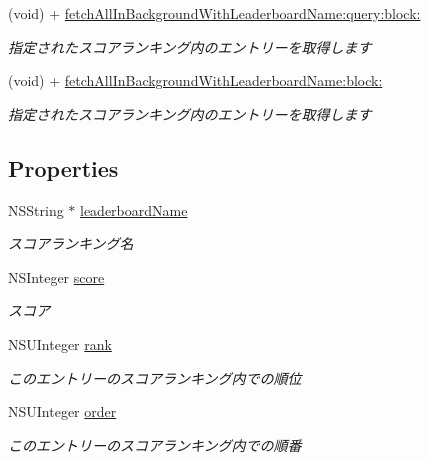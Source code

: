 \begin{DoxyCompactItemize}
(void) + \hyperlink{interface_b_d_leaderboard_entry_af0e742839e99015b1cfdb2f86c4c0522}{fetch\-All\-In\-Background\-With\-Leaderboard\-Name\-:query\-:block\-:}
\begin{DoxyCompactList}\small\item\em 指定されたスコアランキング内のエントリーを取得します \end{DoxyCompactList}\item 
(void) + \hyperlink{interface_b_d_leaderboard_entry_a582590d760e65cdbb151b56ac2bda608}{fetch\-All\-In\-Background\-With\-Leaderboard\-Name\-:block\-:}
\begin{DoxyCompactList}\small\item\em 指定されたスコアランキング内のエントリーを取得します \end{DoxyCompactList}\end{DoxyCompactItemize}
\subsection*{Properties}
\begin{DoxyCompactItemize}
\item 
\hypertarget{interface_b_d_leaderboard_entry_a0ed5274c7b08ef78dbdc768eacecfbf5}{N\-S\-String $\ast$ \hyperlink{interface_b_d_leaderboard_entry_a0ed5274c7b08ef78dbdc768eacecfbf5}{leaderboard\-Name}}\label{interface_b_d_leaderboard_entry_a0ed5274c7b08ef78dbdc768eacecfbf5}

\begin{DoxyCompactList}\small\item\em スコアランキング名 \end{DoxyCompactList}\item 
N\-S\-Integer \hyperlink{interface_b_d_leaderboard_entry_aede55712f84c6407fbf04b4e97a810b1}{score}
\begin{DoxyCompactList}\small\item\em スコア \end{DoxyCompactList}\item 
N\-S\-U\-Integer \hyperlink{interface_b_d_leaderboard_entry_a8f7627ced523263aeb46e00339f1f8d2}{rank}
\begin{DoxyCompactList}\small\item\em このエントリーのスコアランキング内での順位 \end{DoxyCompactList}\item 
N\-S\-U\-Integer \hyperlink{interface_b_d_leaderboard_entry_a898e7a24e32c674f257da00bdc18c155}{order}
\begin{DoxyCompactList}\small\item\em このエントリーのスコアランキング内での順番 \end{DoxyCompactList}\end{DoxyCompactItemize}
